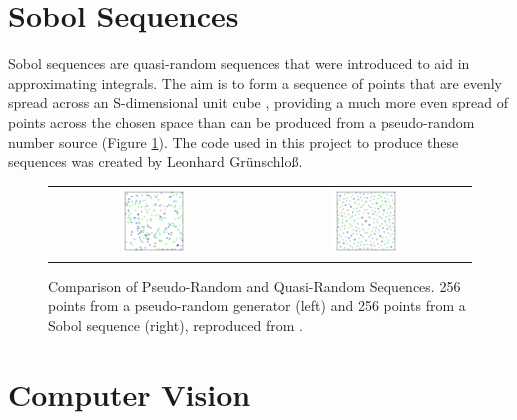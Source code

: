 \section{Sobol Sequences}
\label{Subsection:sobol}

Sobol sequences are quasi-random sequences that were introduced to aid in approximating integrals. The aim is to form a sequence of points that are evenly spread across an S-dimensional unit cube \cite{joe2008constructing}, providing a much more even spread of points across the chosen space than can be produced from a pseudo-random number source (Figure \ref{fig:Sobol}). The code used in this project to produce these sequences was created by Leonhard Gr\"unschlo\ss\space \cite{CodeSource}.

\begin{figure}[H]
    \begin{center}
    \begin{tabular}{ c c }
        \includegraphics[width=0.33\textwidth]{Figures/Pseudorandom_sequence_2D.png} &
        \includegraphics[width=0.33\textwidth]{Figures/Sobol_sequence_2D.png}
    \end{tabular}
    \caption[Comparison of Pseudo-Random and Quasi-Random Sequences]{Comparison of Pseudo-Random and Quasi-Random Sequences. 256 points from a pseudo-random generator (left) and 256 points from a Sobol sequence (right), reproduced from \cite{SobolWiki}.}
    \label{fig:Sobol}
    \end{center}
\end{figure}

\section{Computer Vision}

